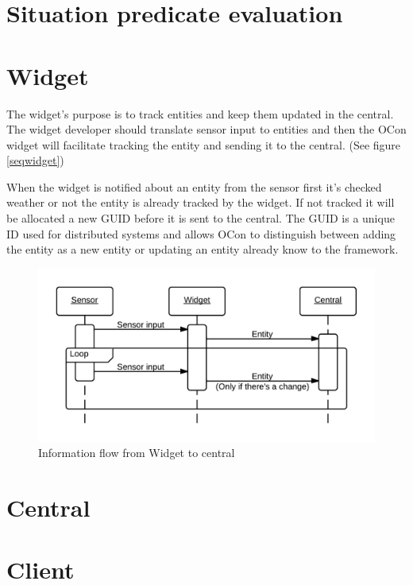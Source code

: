 \documentclass[../report.tex]{subfiles}
\begin{document}
\section{Situation predicate evaluation}

\section{Widget}

The widget's purpose is to track entities and keep them updated in the central. The widget developer should translate sensor input to entities and then the OCon widget will facilitate tracking the entity and sending it to the central. (See figure \ref{seqwidget})

When the widget is notified about an entity from the sensor first it's checked weather or not the entity is already tracked by the widget. If not tracked it will be allocated a new GUID before it is sent to the central. The GUID is a unique ID used for distributed systems and allows OCon to distinguish between adding the entity as a new entity or updating an entity already know to the framework.

\begin{figure}
\centering
\includegraphics[width=\linewidth]{sequencediagram-widget.png}
\caption{Information flow from Widget to central}
\label{fig:seqwidget}
\end{figure}


\section{Central}

\section{Client}
\end{document}
